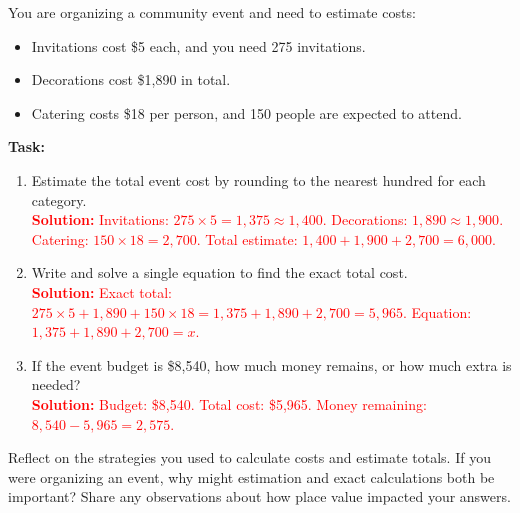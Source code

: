 \documentclass[12pt]{article}
\begin{document}
\vspace{1em}

\begin{tcolorbox}[colframe=black!60, colback=white, 
coltitle=black, colbacktitle=black!15, fonttitle=\bfseries\Large, 
title=Performance Task: Plan a Community Event, halign title=center, left=10pt, right=10pt, top=10pt, bottom=50pt]
You are organizing a community event and need to estimate costs:
\begin{itemize}
    \item Invitations cost \$5 each, and you need 275 invitations.
    \item Decorations cost \$1,890 in total.
    \item Catering costs \$18 per person, and 150 people are expected to attend.
\end{itemize}
\textbf{Task:}
\begin{enumerate}[itemsep=7em]
    \item Estimate the total event cost by rounding to the nearest hundred for each category.\\
    \textcolor{red}{\textbf{Solution:} Invitations: \(275 \times 5 = 1,375 \approx 1,400\). Decorations: \(1,890 \approx 1,900\). Catering: \(150 \times 18 = 2,700\). Total estimate: \(1,400 + 1,900 + 2,700 = 6,000\).}
    
    \item Write and solve a single equation to find the exact total cost.\\
    \textcolor{red}{\textbf{Solution:} Exact total: \(275 \times 5 + 1,890 + 150 \times 18 = 1,375 + 1,890 + 2,700 = 5,965\). Equation: \(1,375 + 1,890 + 2,700 = x\).}
    
    \item If the event budget is \$8,540, how much money remains, or how much extra is needed?\\
    \textcolor{red}{\textbf{Solution:} Budget: \$8,540. Total cost: \$5,965. Money remaining: \(8,540 - 5,965 = 2,575\).}
\end{enumerate}
\end{tcolorbox}

\begin{tcolorbox}[colframe=black!60, colback=white, 
coltitle=black, colbacktitle=black!15, fonttitle=\bfseries\Large, 
title=Reflection, halign title=center, left=10pt, right=10pt, top=10pt, bottom=80pt]
Reflect on the strategies you used to calculate costs and estimate totals. If you were organizing an event, why might estimation and exact calculations both be important? Share any observations about how place value impacted your answers.
\end{tcolorbox}
\end{document}
